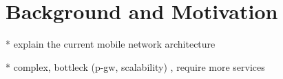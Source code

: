 \section{Background and Motivation}


* explain the current mobile network architecture


* complex, bottleck (p-gw, scalability) , require more services

